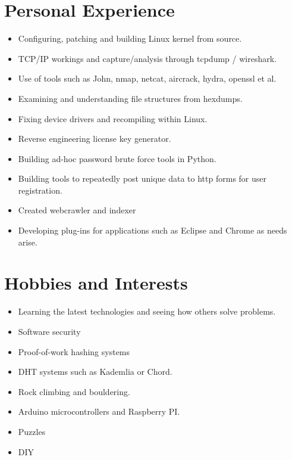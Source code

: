 \documentclass[a4paper,10pt]{moderncv}
\begin{document}
\section{Personal Experience}
\begin{itemize}
\item Configuring, patching and building Linux kernel from source.
\item TCP/IP workings and capture/analysis through tcpdump / wireshark.
\item Use of tools such as John, nmap, netcat, aircrack, hydra, openssl et al.
\item Examining and understanding file structures from hexdumps.
\item Fixing device drivers and recompiling within Linux.
\item Reverse engineering license key generator.
\item Building ad-hoc password brute force tools in Python.
\item Building tools to repeatedly post unique data to http forms for user registration.
\item Created webcrawler and indexer
\item Developing plug-ins for applications such as Eclipse and Chrome as needs arise.
\end{itemize}

\section{Hobbies and Interests}
\begin{itemize}
\item Learning the latest technologies and seeing how others solve problems.
\item Software security
\item Proof-of-work hashing systems
\item DHT systems such as Kademlia or Chord.
\item Rock climbing and bouldering.
\item Arduino microcontrollers and Raspberry PI.
\item Puzzles
\item DIY
\end{itemize}
\end{document}
